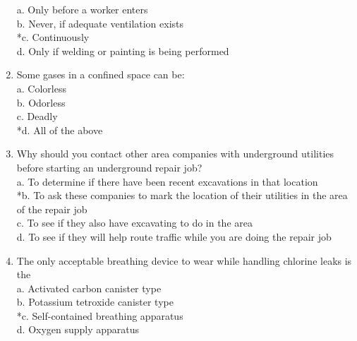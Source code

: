 \begin{enumerate}[1.]
a. Only before a worker enters\\
b. Never, if adequate ventilation exists\\
*c. Continuously\\
d. Only if welding or painting is being performed\\
\item Some gases in a confined space can be:\\
a. Colorless\\
b. Odorless\\
c. Deadly\\
*d. All of the above\\
\item Why should you contact other area companies with underground utilities before starting an underground repair job?\\
a. To determine if there have been recent excavations in that location\\
*b. To ask these companies to mark the location of their utilities in the area of the repair job\\
c. To see if they also have excavating to do in the area\\
d. To see if they will help route traffic while you are doing the repair job\\
\item The only acceptable breathing device to wear while handling chlorine leaks is the\\
a. Activated carbon canister type\\
b. Potassium tetroxide canister type\\
*c. Self-contained breathing apparatus\\
d. Oxygen supply apparatus\\
  \end{enumerate}
